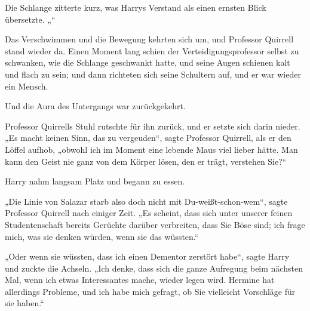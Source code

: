 Die Schlange zitterte kurz, was Harrys Verstand als einen ernsten Blick übersetzte. „“

Das Verschwimmen und die Bewegung kehrten sich um, und Professor Quirrell stand wieder da. Einen Moment lang schien der Verteidigungsprofessor selbst zu schwanken, wie die Schlange geschwankt hatte, und seine Augen schienen kalt und flach zu sein; und dann richteten sich seine Schultern auf, und er war wieder ein Mensch.

Und die Aura des Untergangs war zurückgekehrt.

Professor Quirrells Stuhl rutschte für ihn zurück, und er setzte sich darin nieder. „Es macht keinen Sinn, das zu vergeuden“, sagte Professor Quirrell, als er den Löffel aufhob, „obwohl ich im Moment eine lebende Maus viel lieber hätte. Man kann den Geist nie ganz von dem Körper lösen, den er trägt, verstehen Sie?“

Harry nahm langsam Platz und begann zu essen.

\later

„Die Linie von Salazar starb also doch nicht mit Du-weißt-schon-wem“, sagte Professor Quirrell nach einiger Zeit. „Es scheint, dass sich unter unserer feinen Studentenschaft bereits Gerüchte darüber verbreiten, dass Sie Böse sind; ich frage mich, was sie denken würden, wenn sie das wüssten.“

„Oder wenn sie wüssten, dass ich einen Dementor zerstört habe“, sagte Harry und zuckte die Achseln. „Ich denke, dass sich die ganze Aufregung beim nächsten Mal, wenn ich etwas Interessantes mache, wieder legen wird. Hermine hat allerdings Probleme, und ich habe mich gefragt, ob Sie vielleicht Vorschläge für sie haben.“

